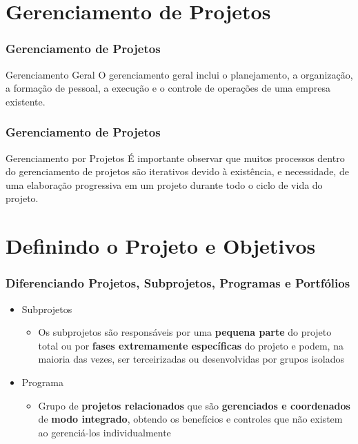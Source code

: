 \section{Gerenciamento de Projetos}

  \begin{frame}
   \frametitle{Gerenciamento de Projetos}
\begin{block}{Gerenciamento Geral}
  O gerenciamento geral inclui o planejamento, a organização, a formação de pessoal, a
execução e o controle de operações de uma empresa existente.
\end{block}
  \end{frame}
  
  \begin{frame}
   \frametitle{Gerenciamento de Projetos}
   \begin{block}{Gerenciamento por Projetos}
    É importante observar que muitos processos dentro do gerenciamento de
projetos são iterativos devido à existência, e necessidade, de uma elaboração
progressiva em um projeto durante todo o ciclo de vida do projeto.
   \end{block}
  \end{frame}


\section{Definindo o Projeto e Objetivos}

\begin{frame}
 \frametitle{Diferenciando Projetos, Subprojetos, Programas e Portfólios}
 \begin{itemize}
  \item Subprojetos
  \begin{itemize}
   \item Os subprojetos são responsáveis por uma \textbf{pequena parte} do projeto total ou por \textbf{fases extremamente específicas} do
   projeto e podem, na maioria das vezes, ser terceirizadas ou desenvolvidas por grupos isolados
  \end{itemize}
  \item Programa
  \begin{itemize}
   \item Grupo de \textbf{projetos relacionados} que são \textbf{gerenciados e coordenados} de \textbf{modo integrado}, obtendo os benefícios e controles que
   não existem ao gerenciá-los individualmente
  \end{itemize}
 \end{itemize}
\end{frame}


